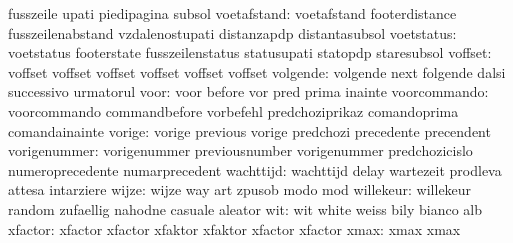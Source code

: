                           fusszeile                 upati
                           piedipagina               subsol
              voetafstand: voetafstand               footerdistance
                           fusszeilenabstand         vzdalenostupati
                           distanzapdp               distantasubsol
               voetstatus: voetstatus                footerstate
                           fusszeilenstatus          statusupati
                           statopdp                  staresubsol
                  voffset: voffset                   voffset
                           voffset                   voffset
                           voffset                   voffset
                 volgende: volgende                  next
                           folgende                  dalsi
                           successivo                urmatorul
                     voor: voor                      before
                           vor                       pred
                           prima                     inainte
             voorcommando: voorcommando              commandbefore
                           vorbefehl                 predchoziprikaz
                           comandoprima              comandainainte
                   vorige: vorige                    previous
                           vorige                    predchozi
                           precedente                precendent
             vorigenummer: vorigenummer              previousnumber
                           vorigenummer              predchozicislo
                           numeroprecedente          numarprecedent
                wachttijd: wachttijd                 delay
                           wartezeit                 prodleva
                           attesa                    intarziere
                    wijze: wijze                     way
                           art                       zpusob
                           modo                      mod
                willekeur: willekeur                 random
                           zufaellig                 nahodne
                           casuale                   aleator
                      wit: wit                       white
                           weiss                     bily
                           bianco                    alb
                  xfactor: xfactor                   xfactor
                           xfaktor                   xfaktor
                           xfactor                   xfactor %
                     xmax: xmax                      xmax
